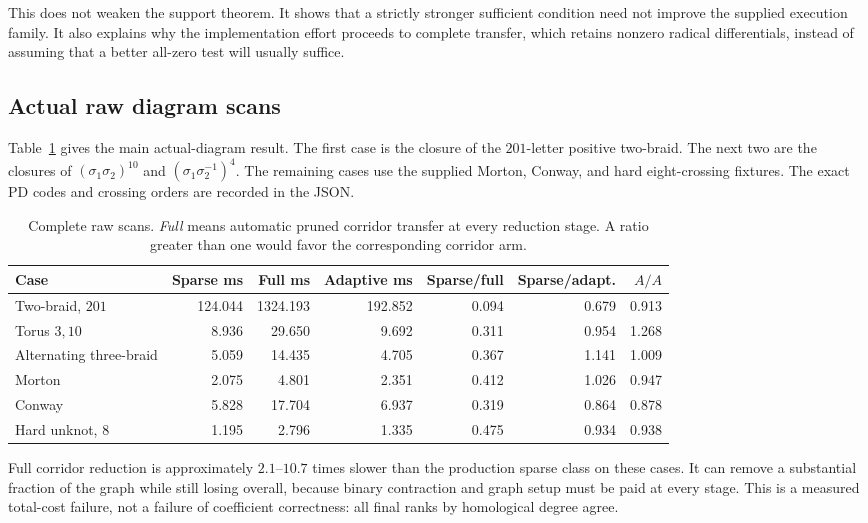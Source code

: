 This does not weaken the support theorem. It shows that a strictly
stronger sufficient condition need not improve the supplied
execution family. It also explains why the implementation effort
proceeds to complete transfer, which retains nonzero radical
differentials, instead of assuming that a better all-zero test will
usually suffice.

\subsection{Actual raw diagram scans}

Table~\ref{tab:actual-corridor} gives the main actual-diagram result.
The first case is the closure of the \(201\)-letter positive
two-braid. The next two are the closures of
\((\sigma_1\sigma_2)^{10}\) and
\((\sigma_1\sigma_2^{-1})^4\). The remaining cases use the supplied
Morton, Conway, and hard eight-crossing fixtures. The exact PD codes
and crossing orders are recorded in the JSON.

\begin{table}[htbp]
\centering
\small
\setlength{\tabcolsep}{4pt}
\begin{tabular}{@{}lrrrrrr@{}}
\toprule
Case & Sparse ms & Full ms & Adaptive ms &
Sparse/full & Sparse/adapt. & \(A/A\)\\
\midrule
Two-braid, \(201\) & 124.044 & 1324.193 & 192.852 & 0.094 & 0.679 & 0.913\\
Torus \(3,10\) & 8.936 & 29.650 & 9.692 & 0.311 & 0.954 & 1.268\\
Alternating three-braid & 5.059 & 14.435 & 4.705 & 0.367 & 1.141 & 1.009\\
Morton & 2.075 & 4.801 & 2.351 & 0.412 & 1.026 & 0.947\\
Conway & 5.828 & 17.704 & 6.937 & 0.319 & 0.864 & 0.878\\
Hard unknot, \(8\) & 1.195 & 2.796 & 1.335 & 0.475 & 0.934 & 0.938\\
\bottomrule
\end{tabular}
\caption{Complete raw scans. \emph{Full} means automatic pruned corridor
transfer at every reduction stage. A ratio greater than one would
favor the corresponding corridor arm.}
\label{tab:actual-corridor}
\end{table}

Full corridor reduction is approximately \(2.1\)--\(10.7\) times
slower than the production sparse class on these cases. It can
remove a substantial fraction of the graph while still losing
overall, because binary contraction and graph setup must be paid
at every stage. This is a measured total-cost failure, not a
failure of coefficient correctness: all final ranks by homological
degree agree.

